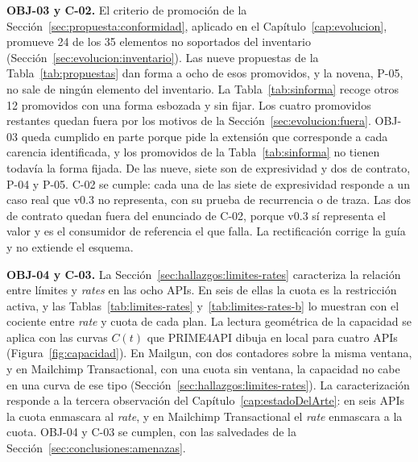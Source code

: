 \textbf{OBJ-03 y C-02.} El criterio de promoción de la Sección~\ref{sec:propuesta:conformidad}, aplicado en el Capítulo~\ref{cap:evolucion}, promueve 24 de los 35 elementos no soportados del inventario (Sección~\ref{sec:evolucion:inventario}).
Las nueve propuestas de la Tabla~\ref{tab:propuestas} dan forma a ocho de esos promovidos, y la novena, P-05, no sale de ningún elemento del inventario.
La Tabla~\ref{tab:sinforma} recoge otros 12 promovidos con una forma esbozada y sin fijar.
Los cuatro promovidos restantes quedan fuera por los motivos de la Sección~\ref{sec:evolucion:fuera}.
OBJ-03 queda cumplido en parte porque pide la extensión que corresponde a cada carencia identificada, y los promovidos de la Tabla~\ref{tab:sinforma} no tienen todavía la forma fijada.
De las nueve, siete son de expresividad y dos de contrato, P-04 y P-05.
C-02 se cumple: cada una de las siete de expresividad responde a un caso real que v0.3 no representa, con su prueba de recurrencia o de traza.
Las dos de contrato quedan fuera del enunciado de C-02, porque v0.3 sí representa el valor y es el consumidor de referencia el que falla.
La rectificación corrige la guía y no extiende el esquema.

\textbf{OBJ-04 y C-03.} La Sección~\ref{sec:hallazgos:limites-rates} caracteriza la relación entre límites y \textit{rates} en las ocho APIs.
En seis de ellas la cuota es la restricción activa, y las Tablas~\ref{tab:limites-rates} y~\ref{tab:limites-rates-b} lo muestran con el cociente entre \textit{rate} y cuota de cada plan.
La lectura geométrica de la capacidad \citep{ruizcortes2025cajanegra} se aplica con las curvas $C(t)$ que PRIME4API dibuja en local para cuatro APIs (Figura~\ref{fig:capacidad}).
En Mailgun, con dos contadores sobre la misma ventana, y en Mailchimp Transactional, con una cuota sin ventana, la capacidad no cabe en una curva de ese tipo (Sección~\ref{sec:hallazgos:limites-rates}).
La caracterización responde a la tercera observación del Capítulo~\ref{cap:estadoDelArte}: en seis APIs la cuota enmascara al \textit{rate}, y en Mailchimp Transactional el \textit{rate} enmascara a la cuota.
OBJ-04 y C-03 se cumplen, con las salvedades de la Sección~\ref{sec:conclusiones:amenazas}.


